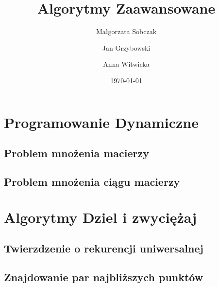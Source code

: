 \documentclass[11pt,a4paper]{article}
\begin{document}
                  

\title{Algorytmy Zaawansowane}
\author{Małgorzata Sobczak \and Jan Grzybowski \and Anna Witwicka}
\date{\today}

\maketitle 
                
\clearpage

\tableofcontents
\clearpage








\section{Programowanie Dynamiczne}


\subsection{Problem mnożenia macierzy}


\subsection{Problem mnożenia ciągu macierzy}


\section{Algorytmy Dziel i zwyciężaj}


\subsection{Twierzdzenie o rekurencji uniwersalnej}


\subsection{Znajdowanie par najbliższych punktów}

\end{document}
